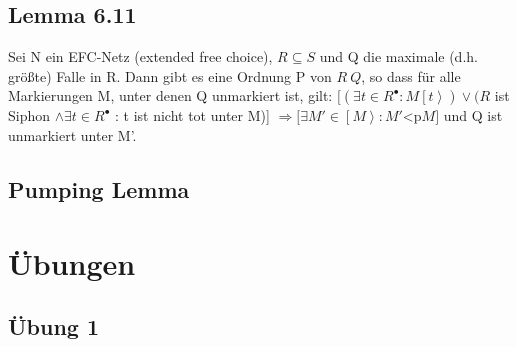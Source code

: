 \documentclass[12pt]{scrreprt}
\begin{document}
\section{Lemma 6.11}
Sei N ein EFC-Netz (extended free choice), $R \subseteq S$ und Q die maximale (d.h. größte) Falle in R. Dann gibt es eine Ordnung P von $R \ Q$, so dass für alle Markierungen M, unter denen Q unmarkiert ist, gilt:\newline
$[(\exists t \in R^\bullet : M\left[t\right>) \vee (R$ ist Siphon $\wedge \exists t \in R^\bullet$ : t ist nicht tot unter M)] $\Rightarrow [ \exists M' \in \left[M\right> : M' $\ac{<p}$M]$ und Q ist unmarkiert unter M'.

\section{Pumping Lemma}


\chapter{Übungen}

\section{Übung 1}
\end{document}
